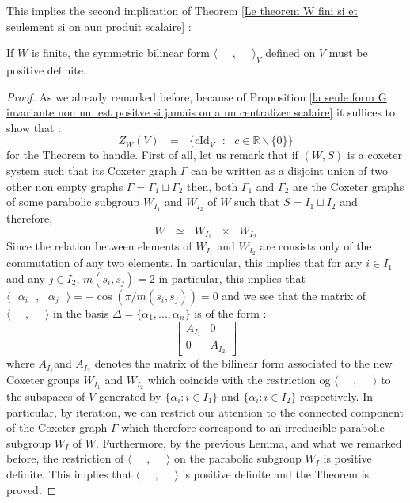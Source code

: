 \documentclass[envcountsame,envcountchap]{svmono}
\newcommand{\R}{\mathbb R}
\newcommand{\prods}[2]{\langle\qq #1\qq,\qq#2\qq\rangle}
\newcommand{\qq}{\text{ }}
\begin{document}
This implies the second implication of Theorem \ref{Le theorem W fini si et seulement si on  aun produit scalaire} :
\begin{theorem}
	If $W$ is finite, the symmetric bilinear form  $\prods{}{}_V$ defined on $V$ must be positive definite.
\end{theorem}
\begin{proof}
	As we already remarked before, because of Proposition \ref{la seule form G invariante non nul est positve si jamais on a un centralizer scalaire} it suffices to show that :
	\begin{equation}
	Z_W(V)\qq=\qq\{c\mbox{Id}_V\qq:\qq c\in \R\backslash\{0\}\}
	\end{equation} 
	for the Theorem to handle. First of all, let us remark that if $(W,S)$ is a coxeter system such that its Coxeter graph $\Gamma$ can be written as a disjoint union of two other non empty graphs $\Gamma=\Gamma_1\sqcup \Gamma_2$ then, both $\Gamma_1$ and $\Gamma_2$ are the Coxeter graphs of some parabolic subgroup $W_{I_1}$ and $W_{I_2}$ of $W$ such that $S=I_1\sqcup I_2$ and therefore, 
	\begin{equation}
	W\qq\simeq\qq W_{I_1}\qq \times \qq W_{I_2}
	\end{equation}
	Since the relation between elements of  $W_{I_1}$ and $W_{I_2}$ are consists only of the commutation of any two elements. In particular, this implies that for any $i\in I_1$ and any $j\in I_2$, $m(s_i,s_j)=2$ in particular, this implies that $\prods{\alpha_i}{\alpha_j}=-\cos(\pi/m(s_i,s_j))=0$ and we see that the matrix of $\prods{}{}$ in the basis $\Delta=\{\alpha_1,...,\alpha_n\}$ is of the form :
	\begin{equation}
	\begin{bmatrix}
	A_{I_1} & 0\\
	0 & A_{I_2}
	\end{bmatrix}
	\end{equation}
	where $A_{I_1}$and $A_{I_2}$ denotes the matrix of the bilinear form associated to the new Coxeter groups $W_{I_1}$ and $W_{I_2}$ which coincide with the restriction og $\prods{}{}$ to the subspaces of $V$ generated by $\{\alpha_i:i\in I_1\}$ and $\{\alpha_i:i\in I_2\}$ respectively. In particular, by iteration, we can restrict our attention to the connected component of the Coxeter graph $\Gamma$ which therefore correspond to an irreducible parabolic subgroup $W_I$ of $W$. Furthermore, by the previous Lemma, and what we remarked before, the restriction of $\prods{}{}$ on the parabolic subgroup $W_I$ is positive definite. This implies that $\prods{}{}$ is positive definite and the Theorem is proved. 
\end{proof}
\end{document}
